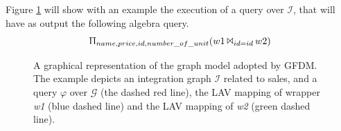 \documentclass[12pt,a4paper]{report}
\newcommand\systemName{GFDM}
\newcommand\globalQuery{\varphi}
\newcommand\targetGraph{\mathcal{G}}
\newcommand\integrationGraph{\mathcal{I}}
\begin{document}
Figure \ref{fig:Model} will show with an example the execution of a query over $\integrationGraph$, that will have as output the following algebra query.
%
\begin{equation}
    \Uppi_{name,price,id,number\_of\_unit}(w1\, \Bowtie_{id=id}\,w2)
\end{equation}
%
\begin{figure} [ht]
    \caption{A graphical representation of the graph model adopted by \systemName. The example depicts an integration graph $\integrationGraph$ related to sales, and a query $\globalQuery$ over $\targetGraph$ (the dashed red line), the LAV mapping of wrapper \textit{w1} (blue dashed line) and the LAV mapping of \textit{w2} (green dashed line).}
    \label{fig:Model}
\end{figure}
%

\end{document}
